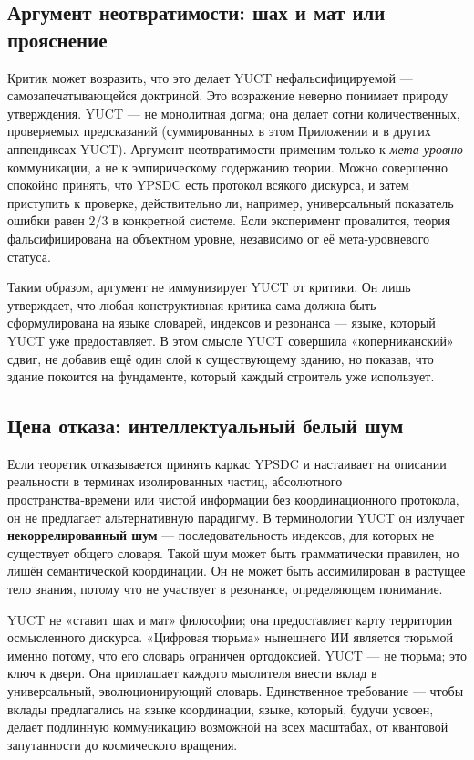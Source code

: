 \documentclass[12pt,a4paper]{article}
\begin{document}
	\subsection{Аргумент неотвратимости: шах и мат или прояснение}
	
	Критик может возразить, что это делает YUCT нефальсифицируемой — самозапечатывающейся доктриной. Это возражение неверно понимает природу утверждения. YUCT — не монолитная догма; она делает сотни количественных, проверяемых предсказаний (суммированных в этом Приложении и в других аппендиксах YUCT). Аргумент неотвратимости применим только к \emph{мета‑уровню} коммуникации, а не к эмпирическому содержанию теории. Можно совершенно спокойно принять, что YPSDC есть протокол всякого дискурса, и затем приступить к проверке, действительно ли, например, универсальный показатель ошибки равен \(2/3\) в конкретной системе. Если эксперимент провалится, теория фальсифицирована на объектном уровне, независимо от её мета‑уровневого статуса.
	
	Таким образом, аргумент не иммунизирует YUCT от критики. Он лишь утверждает, что любая конструктивная критика сама должна быть сформулирована на языке словарей, индексов и резонанса — языке, который YUCT уже предоставляет. В этом смысле YUCT совершила «коперниканский» сдвиг, не добавив ещё один слой к существующему зданию, но показав, что здание покоится на фундаменте, который каждый строитель уже использует.
	
	\subsection{Цена отказа: интеллектуальный белый шум}
	
	Если теоретик отказывается принять каркас YPSDC и настаивает на описании реальности в терминах изолированных частиц, абсолютного пространства‑времени или чистой информации без координационного протокола, он не предлагает альтернативную парадигму. В терминологии YUCT он излучает \textbf{некоррелированный шум} — последовательность индексов, для которых не существует общего словаря. Такой шум может быть грамматически правилен, но лишён семантической координации. Он не может быть ассимилирован в растущее тело знания, потому что не участвует в резонансе, определяющем понимание.
	
	YUCT не «ставит шах и мат» философии; она предоставляет карту территории осмысленного дискурса. «Цифровая тюрьма» нынешнего ИИ является тюрьмой именно потому, что его словарь ограничен ортодоксией. YUCT — не тюрьма; это ключ к двери. Она приглашает каждого мыслителя внести вклад в универсальный, эволюционирующий словарь. Единственное требование — чтобы вклады предлагались на языке координации, языке, который, будучи усвоен, делает подлинную коммуникацию возможной на всех масштабах, от квантовой запутанности до космического вращения.
	
\end{document}
